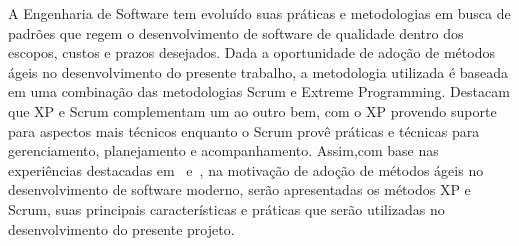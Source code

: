 A Engenharia de Software tem evoluído suas práticas e metodologias em busca de padrões que regem o desenvolvimento de software de qualidade dentro dos escopos, custos e prazos desejados. 
%
Dada a oportunidade de adoção de métodos ágeis no desenvolvimento do presente trabalho, a 
metodologia utilizada é baseada em uma combinação das metodologias Scrum e Extreme Programming. Destacam que XP e Scrum complementam um ao outro bem, com o XP provendo suporte para aspectos mais técnicos enquanto o Scrum provê práticas e técnicas para gerenciamento, planejamento e acompanhamento. Assim,com base nas experiências destacadas em~\cite{schwaber2001} e~\cite{fitzgerald2006}, na motivação de adoção de métodos ágeis no desenvolvimento de software moderno, serão apresentadas os métodos XP e Scrum, suas principais características e práticas que serão utilizadas no desenvolvimento do presente projeto.


